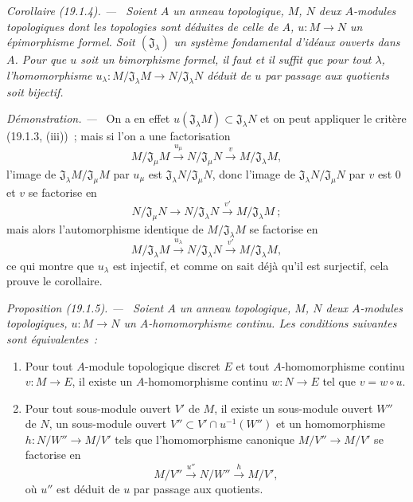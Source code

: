 \documentclass[10pt,oneside]{book}
\makeatletter
\newcommand{\setmanualcurrentlabel}[1]{\def\@currentlabel{#1}}
\newenvironment{proposition}[1][]{%
  \setmanualcurrentlabel{#1}\par\medskip\noindent\itshape Proposition (#1). ---\ }{\par}
\newenvironment{corollary}[1][]{%
  \setmanualcurrentlabel{#1}\par\medskip\noindent\itshape Corollaire (#1). ---\ }{\par}
\newenvironment{proof}{%
  \par\medskip\noindent\textit{Démonstration. ---\ }}{\par}
\makeatother
\begin{document}
\begin{corollary}[19.1.4]
\label{0.19.1.4-fr}
Soient $A$ un anneau topologique, $M$, $N$ deux $A$-modules topologiques dont
les topologies sont déduites de celle de $A$, $u:M\to N$ un épimorphisme
formel. Soit $(\mathfrak J_\lambda)$ un système fondamental d'idéaux ouverts
dans $A$. Pour que $u$ soit un bimorphisme formel, il faut et il suffit que pour
tout $\lambda$, l'homomorphisme
$u_\lambda:M/\mathfrak J_\lambda M\to N/\mathfrak J_\lambda N$ déduit de $u$
par passage aux quotients soit bijectif.
\end{corollary}

\begin{proof}
On a en effet $u(\mathfrak J_\lambda M)\subset\mathfrak J_\lambda N$ et on
peut appliquer le critère (19.1.3, (iii))~; mais si l'on a une factorisation
\[
  M/\mathfrak J_\mu M\xrightarrow{u_\mu}
  N/\mathfrak J_\mu N\xrightarrow{v}M/\mathfrak J_\lambda M,
\]
l'image de $\mathfrak J_\lambda M/\mathfrak J_\mu M$ par $u_\mu$ est
$\mathfrak J_\lambda N/\mathfrak J_\mu N$, donc l'image de
$\mathfrak J_\lambda N/\mathfrak J_\mu N$ par $v$ est 0 et $v$ se factorise en
\[
  N/\mathfrak J_\mu N\longrightarrow N/\mathfrak J_\lambda N
  \xrightarrow{v'}M/\mathfrak J_\lambda M~;
\]
mais alors l'automorphisme identique de $M/\mathfrak J_\lambda M$ se factorise
en
\[
  M/\mathfrak J_\lambda M\xrightarrow{u_\lambda}
  N/\mathfrak J_\lambda N\xrightarrow{v'}M/\mathfrak J_\lambda M,
\]
ce qui montre que $u_\lambda$ est injectif, et comme on sait déjà qu'il est
surjectif, cela prouve le corollaire.
\end{proof}

\begin{proposition}[19.1.5]
\label{0.19.1.5-fr}
Soient $A$ un anneau topologique, $M$, $N$ deux $A$-modules topologiques,
$u:M\to N$ un $A$-homomorphisme continu. Les conditions suivantes sont
équivalentes~:
\begin{enumerate}
  \item[a)] Pour tout $A$-module topologique discret $E$ et tout
  $A$-homomorphisme continu $v:M\to E$, il existe un $A$-homomorphisme continu
  $w:N\to E$ tel que $v=w\circ u$.
  \item[b)] Pour tout sous-module ouvert $V'$ de $M$, il existe un sous-module
  ouvert $W''$ de $N$, un sous-module ouvert
  $V''\subset V'\cap u^{-1}(W'')$ et un homomorphisme
  $h:N/W''\to M/V'$ tels que l'homomorphisme canonique
  $M/V''\to M/V'$ se factorise en
  \[
    M/V''\xrightarrow{u''}N/W''\xrightarrow{h}M/V',
  \]
  où $u''$ est déduit de $u$ par passage aux quotients.
\end{enumerate}
\end{proposition}
\end{document}
